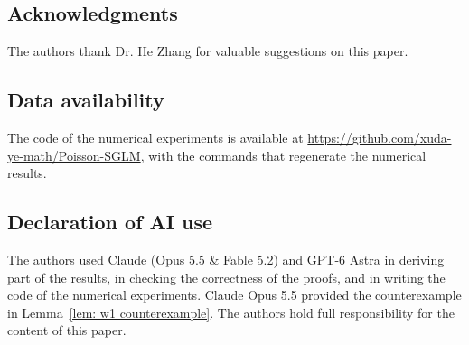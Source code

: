 \documentclass{article}
\numberwithin{equation}{section}
\begin{document}
\subsection*{Acknowledgments}
The authors thank Dr. He Zhang for valuable suggestions on this paper.

\subsection*{Data availability}

The code of the numerical experiments is available at \url{https://github.com/xuda-ye-math/Poisson-SGLM}, with the commands that regenerate the numerical results.

\subsection*{Declaration of AI use}
The authors used Claude (Opus 5.5 \& Fable 5.2) and GPT-6 Astra in deriving part of the results, in checking the correctness of the proofs, and in writing the code of the numerical experiments. Claude Opus 5.5 provided the counterexample in Lemma~\ref{lem: w1 counterexample}. The authors hold full responsibility for the content of this paper.

\appendix
\renewcommand{\theHsection}{appendix.\Alph{section}}
\renewcommand{\theHequation}{appendix.\Alph{section}.\arabic{equation}}


\end{document}
